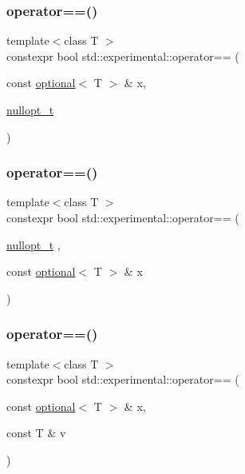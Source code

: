 \subsubsection{\texorpdfstring{operator==()}{operator==()}\hspace{0.1cm}{\footnotesize\ttfamily [2/9]}}
{\footnotesize\ttfamily template$<$class T $>$ \\
constexpr bool std\+::experimental\+::operator== (\begin{DoxyParamCaption}\item[{const \hyperlink{classstd_1_1experimental_1_1optional}{optional}$<$ T $>$ \&}]{x,  }\item[{\hyperlink{structstd_1_1experimental_1_1nullopt__t}{nullopt\+\_\+t}}]{ }\end{DoxyParamCaption})\hspace{0.3cm}{\ttfamily [noexcept]}}

\mbox{\label{namespacestd_1_1experimental_a23a59ad403fb2809087806ff9037d42e}} 
\subsubsection{\texorpdfstring{operator==()}{operator==()}\hspace{0.1cm}{\footnotesize\ttfamily [3/9]}}
{\footnotesize\ttfamily template$<$class T $>$ \\
constexpr bool std\+::experimental\+::operator== (\begin{DoxyParamCaption}\item[{\hyperlink{structstd_1_1experimental_1_1nullopt__t}{nullopt\+\_\+t}}]{,  }\item[{const \hyperlink{classstd_1_1experimental_1_1optional}{optional}$<$ T $>$ \&}]{x }\end{DoxyParamCaption})\hspace{0.3cm}{\ttfamily [noexcept]}}

\mbox{\label{namespacestd_1_1experimental_ad40f3ff2c6562139fe910ab3d0a63f10}} 
\subsubsection{\texorpdfstring{operator==()}{operator==()}\hspace{0.1cm}{\footnotesize\ttfamily [4/9]}}
{\footnotesize\ttfamily template$<$class T $>$ \\
constexpr bool std\+::experimental\+::operator== (\begin{DoxyParamCaption}\item[{const \hyperlink{classstd_1_1experimental_1_1optional}{optional}$<$ T $>$ \&}]{x,  }\item[{const T \&}]{v }\end{DoxyParamCaption})}


